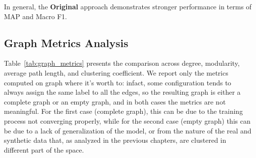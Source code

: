 In general, the \textcolor{drawred}{\textbf{Original}} approach demonstrates stronger performance in terms of MAP and Macro F1.







\subsection*{Graph Metrics Analysis}

Table~\ref{tab:graph_metrics} presents the comparison across degree, modularity, average path length, and clustering coefficient. We report only the metrics computed on graph where it's worth to: infact, some configuration tends to always assign the same label to all the edges, so the resulting graph is either a complete graph or an empty graph, and in both cases the metrics are not meaningful. For the first case (complete graph), this can be due to the training process not converging properly, while for the second case (empty graph) this can be due to a lack of generalization of the model, or from the nature of the real and synthetic data that, as analyzed in the previous chapters, are clustered in different part of the space.

